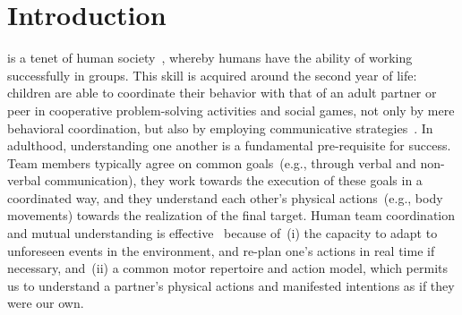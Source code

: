 
\section{Introduction}

 is a tenet of human society~\cite{turner:1975}, whereby humans have the ability of working successfully in groups.
This skill is acquired around the second year of life: children are able to coordinate their behavior with that of an adult partner or peer in cooperative problem-solving activities and social games, not only by mere behavioral coordination, but also by
employing communicative strategies~\cite{melis:2010:rstb}.
In adulthood, understanding one another is a fundamental pre-requisite for success.
Team members typically agree on common goals~(e.g., through verbal and non-verbal communication), they work towards the execution of these goals in a coordinated way, and they understand each other's physical actions~(e.g., body movements) towards the realization of the final target.
Human team coordination and mutual understanding is effective~\cite{ramnani:2004:natureneuro} because of~(i) the capacity to adapt to unforeseen events in the environment, and re-plan one's actions in real time if necessary, and~(ii) a common motor repertoire and action model, which permits us to understand a partner's physical actions and manifested intentions as if they were our own.
